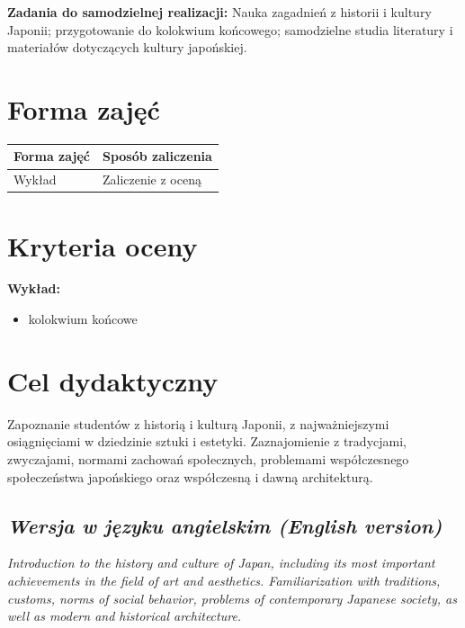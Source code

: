\documentclass[12pt, a4paper]{article}
\newcommand{\thdrule}{\noalign{\global\setlength{\extrarowheight}{0pt}}}
\newcommand{\thdend}{\noalign{\global\setlength{\extrarowheight}{3pt}}}
\begin{document}
\vspace{4pt}
\noindent\textbf{Zadania do samodzielnej realizacji:} Nauka zagadnień z historii i kultury Japonii; przygotowanie do kolokwium końcowego; samodzielne studia literatury i materiałów dotyczących kultury japońskiej.

\section{Forma zajęć}

\begin{center}
{\scriptsize
\begin{tabular}{m{5cm}m{8cm}}
\thdrule\toprule
\rowcolor{pjatkRed} {\color{white}\textbf{Forma zajęć}} & {\color{white}\textbf{Sposób zaliczenia}} \\
\midrule\thdend
  \rowcolor{tableRowLight} Wykład & Zaliczenie z oceną \\
\bottomrule
\end{tabular}}
\end{center}

\section{Kryteria oceny}

\textbf{Wykład:}
\begin{itemize}
  \item kolokwium końcowe
\end{itemize}
\vspace{4pt}


\section{Cel dydaktyczny}

Zapoznanie studentów z historią i kulturą Japonii, z najważniejszymi osiągnięciami w dziedzinie sztuki i estetyki. Zaznajomienie z tradycjami, zwyczajami, normami zachowań społecznych, problemami współczesnego społeczeństwa japońskiego oraz współczesną i dawną architekturą.

\subsection*{\textit{Wersja w języku angielskim (English version)}}

\textit{Introduction to the history and culture of Japan, including its most important achievements in the field of art and aesthetics. Familiarization with traditions, customs, norms of social behavior, problems of contemporary Japanese society, as well as modern and historical architecture.}
\end{document}
